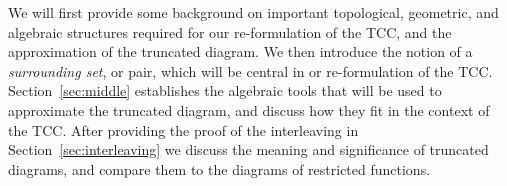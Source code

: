 We will first provide some background on important topological, geometric, and algebraic structures required for our re-formulation of the TCC, and the approximation of the truncated diagram.
We then introduce the notion of a \emph{surrounding set}, or pair, which will be central in or re-formulation of the TCC.
Section~\ref{sec:middle} establishes the algebraic tools that will be used to approximate the truncated diagram, and discuss how they fit in the context of the TCC.
After providing the proof of the interleaving in Section~\ref{sec:interleaving} we discuss the meaning and significance of truncated diagrams, and compare them to the diagrams of restricted functions.
